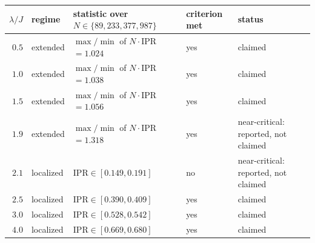 \begin{tabular}{rlllp{4.2cm}}
\toprule
$\lambda/J$ & regime & statistic over $N\in\{89,233,377,987\}$ & criterion met & status \\
\midrule
$0.5$ & extended & $\max/\min$ of $N\cdot\mathrm{IPR}$ $=1.024$ & yes & claimed \\
$1.0$ & extended & $\max/\min$ of $N\cdot\mathrm{IPR}$ $=1.038$ & yes & claimed \\
$1.5$ & extended & $\max/\min$ of $N\cdot\mathrm{IPR}$ $=1.056$ & yes & claimed \\
$1.9$ & extended & $\max/\min$ of $N\cdot\mathrm{IPR}$ $=1.318$ & yes & near-critical: reported, not claimed \\
$2.1$ & localized & $\mathrm{IPR}\in[0.149,0.191]$ & no & near-critical: reported, not claimed \\
$2.5$ & localized & $\mathrm{IPR}\in[0.390,0.409]$ & yes & claimed \\
$3.0$ & localized & $\mathrm{IPR}\in[0.528,0.542]$ & yes & claimed \\
$4.0$ & localized & $\mathrm{IPR}\in[0.669,0.680]$ & yes & claimed \\
\bottomrule
\end{tabular}
